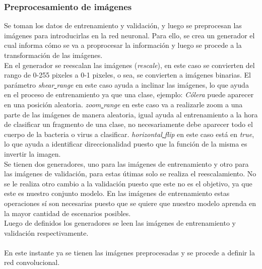 \documentclass{book}
\begin{document}
				\subsubsection{Preprocesamiento de im\'agenes}
					Se toman los datos de entrenamiento y validaci\'on, y luego se preprocesan las im\'agenes para introducirlas en la red neuronal. Para ello, se crea un generador el cual informa c\'omo se va a proprocesar la informaci\'on y luego se procede a la transformaci\'on de las im\'agenes. \\
					En el generador se reescalan las im\'agenes (\textit{rescale}), en este caso se convierten del rango de 0-255 pixeles a 0-1 pixeles, o sea, se convierten a im\'agenes binarias. El par\'ametro \textit{shear\underline{ }range} en este caso ayuda a inclinar las im\'agenes, lo que ayuda en el proceso de entrenamiento ya que una clase, ejemplo: \textit{C\'olera} puede aparecer en una posici\'on aleatoria. \textit{zoom\underline{ }range} en este caso va a realizarle zoom a una parte de las im\'agenes de manera aleatoria, igual ayuda al entrenamiento a la hora de clasificar un fragmento de una clase, no necesariamente debe aparecer todo el cuerpo de la bacteria o virus a clasificar. \textit{horizontal\underline{ }flip} en este caso est\'a en \textit{true}, lo que ayuda a identificar direccionalidad puesto que la funci\'on de la misma es invertir la imagen. \\
					Se tienen dos generadores, uno para las im\'agenes de entrenamiento y otro para las im\'agenes de validaci\'on, para estas \'utimas solo se realiza el reescalamiento. No se le realiza otro cambio a la validaci\'on puesto que este no es el objetivo, ya que este es nuestro conjunto modelo. En las im\'agenes de entrenamiento estas operaciones s\'i son necesarias puesto que se quiere que nuestro modelo aprenda en la mayor cantidad de escenarios posibles. \\
					Luego de definidos los generadores se leen las im\'agenes de entrenamiento y validaci\'on respectivamente. \\
					\\
					En este instante ya se tienen las im\'agenes preprocesadas y se procede a definir la red convolucional. 
				
\end{document}
